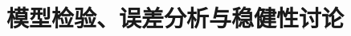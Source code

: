\documentclass[12pt,a4paper]{article}
\newcommand{\tip}[1]{\par\noindent\textbf{【提示】} #1\par}
\begin{document}

\section{模型检验、误差分析与稳健性讨论}



\end{document}
